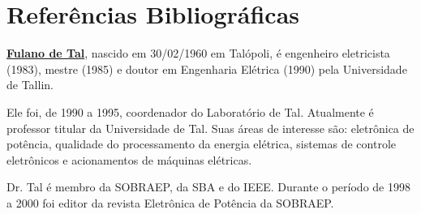 \documentclass[portugues]{sobraep}
\begin{document}



\section*{Referências Bibliográficas}
\noindent\textbf{\underline{Fulano de Tal}}, nascido em 30/02/1960 em Talópoli, é engenheiro eletricista (1983), mestre (1985) e doutor em Engenharia Elétrica (1990) pela Universidade de Tallin.

Ele foi, de 1990 a 1995, coordenador do Laboratório de Tal. Atualmente é professor titular da Universidade de Tal. Suas áreas de interesse são: eletrônica de potência, qualidade do processamento da energia elétrica, sistemas de controle eletrônicos e acionamentos de máquinas elétricas.

Dr. Tal é membro da SOBRAEP, da SBA e do IEEE. Durante o período de 1998 a 2000 foi editor da revista Eletrônica de Potência da SOBRAEP.
\end{document}
